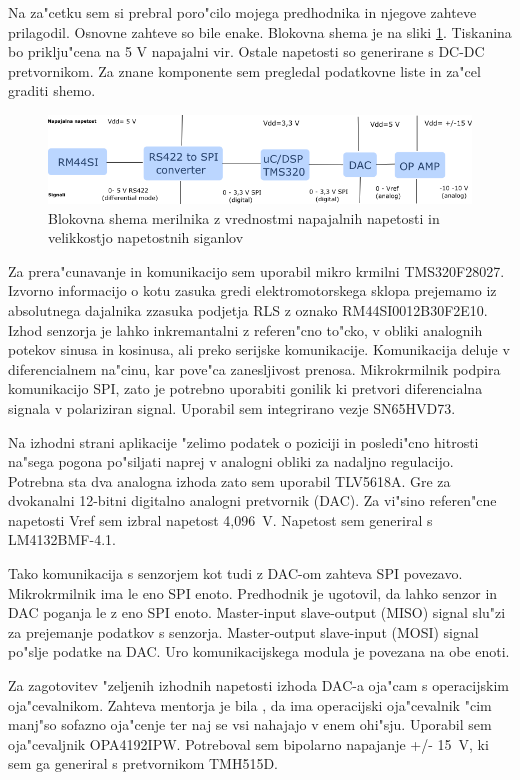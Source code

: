 \documentclass[a4paper]{article}
\begin{document}
Na za"cetku sem si prebral poro"cilo mojega predhodnika in njegove zahteve prilagodil. Osnovne zahteve so bile enake. Blokovna shema je na sliki \ref{fig:blokovna}.  Tiskanina bo priklju"cena na 5 V napajalni vir. Ostale napetosti so generirane s DC-DC pretvornikom. Za znane komponente sem pregledal podatkovne liste in za"cel graditi shemo.

\begin{figure}[h!]
	\centering
	\includegraphics[width=\linewidth]{blokovna_shema.png}
	\caption{Blokovna shema merilnika z vrednostmi napajalnih napetosti in velikkostjo napetostnih siganlov}
	\label{fig:blokovna}
\end{figure}

Za prera"cunavanje in komunikacijo sem uporabil mikro krmilni TMS320F28027. Izvorno informacijo o kotu zasuka gredi elektromotorskega sklopa prejemamo iz absolutnega dajalnika zzasuka podjetja RLS z oznako RM44SI0012B30F2E10. Izhod senzorja je lahko inkremantalni z referen"cno to"cko, v obliki analognih potekov sinusa in kosinusa, ali preko serijske komunikacije. Komunikacija deluje v diferencialnem na"cinu, kar pove"ca zanesljivost prenosa. Mikrokrmilnik podpira komunikacijo SPI, zato je potrebno uporabiti gonilik ki pretvori diferencialna signala v  polariziran signal. Uporabil sem integrirano vezje SN65HVD73.

Na izhodni strani aplikacije "zelimo podatek o poziciji in posledi"cno hitrosti na"sega pogona po"siljati naprej v analogni obliki za nadaljno regulacijo. Potrebna sta dva analogna izhoda zato sem uporabil TLV5618A. Gre za dvokanalni 12-bitni digitalno analogni pretvornik (DAC). Za vi"sino referen"cne napetosti Vref sem izbral napetost 4,096~V. Napetost sem generiral s LM4132BMF-4.1. 

Tako komunikacija s senzorjem kot tudi z DAC-om zahteva SPI povezavo. Mikrokrmilnik ima le eno SPI enoto. Predhodnik je ugotovil, da lahko senzor in DAC poganja le z eno SPI enoto. Master-input slave-output (MISO) signal slu"zi za prejemanje podatkov s senzorja. Master-output slave-input (MOSI) signal po"slje podatke na DAC. Uro komunikacijskega modula je povezana na obe enoti. 

Za zagotovitev "zeljenih izhodnih napetosti izhoda DAC-a oja"cam s operacijskim oja"cevalnikom. Zahteva mentorja je bila , da ima operacijski oja"cevalnik "cim manj"so sofazno oja"cenje ter naj se vsi nahajajo v enem ohi"sju. Uporabil sem oja"cevaljnik OPA4192IPW. Potreboval sem bipolarno napajanje +/- 15~V, ki sem ga generiral s pretvornikom TMH515D.
\end{document}
